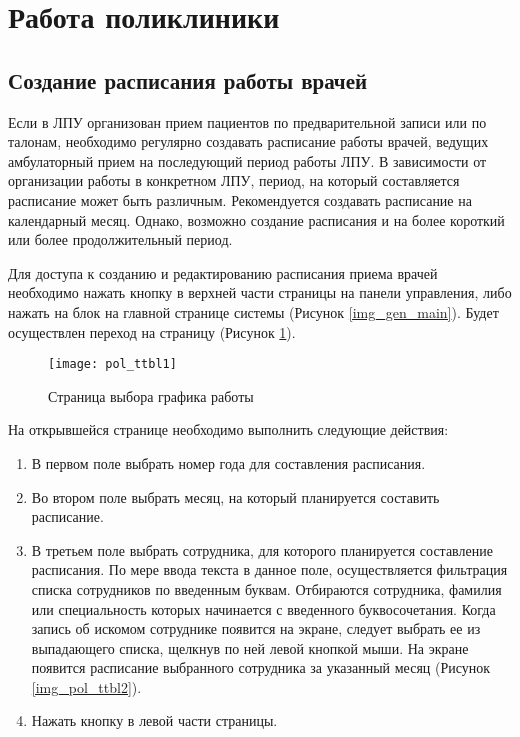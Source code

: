 \newpage
\section{Работа поликлиники}

\subsection{Создание расписания работы врачей} \label{pol_ttbl_new}

Если в ЛПУ организован прием пациентов по предварительной записи или по талонам, необходимо регулярно создавать расписание работы врачей, ведущих амбулаторный прием на последующий период работы ЛПУ. В зависимости от организации работы в конкретном ЛПУ, период, на который составляется расписание может быть различным. Рекомендуется создавать расписание на календарный месяц. Однако, возможно создание расписания и на более короткий или более продолжительный период.

Для доступа к созданию и редактированию расписания приема врачей необходимо нажать кнопку  в верхней части страницы на панели управления, либо нажать на блок  на главной странице системы (Рисунок \ref{img_gen_main}). Будет осуществлен переход на страницу  (Рисунок \ref{img_pol_ttbl1}).

\begin{figure}[ht]\centering
 \texttt{[image: pol\_ttbl1]}
 \caption{Страница выбора графика работы}
 \label{img_pol_ttbl1}
\end{figure}

На открывшейся странице необходимо выполнить следующие действия:
\begin{enumerate}
 \item В первом поле выбрать номер года для составления расписания.
 \item Во втором поле выбрать месяц, на который планируется составить расписание.
 \item В третьем поле выбрать сотрудника, для которого планируется составление расписания. По мере ввода текста в данное поле, осуществляется фильтрация списка сотрудников по введенным буквам. Отбираются сотрудника, фамилия или специальность которых начинается с введенного буквосочетания. Когда запись об искомом сотруднике появится на экране, следует выбрать ее из выпадающего списка, щелкнув по ней левой кнопкой мыши. На экране появится расписание выбранного сотрудника за указанный месяц (Рисунок \ref{img_pol_ttbl2}). 
 \item Нажать кнопку  в левой части страницы. 
\end{enumerate}

